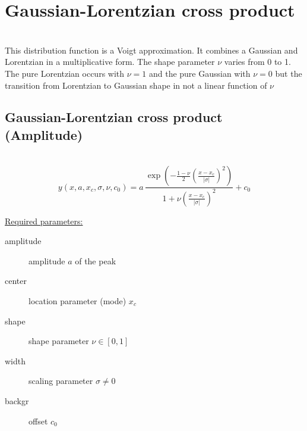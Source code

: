 \clearpage
\section{Gaussian-Lorentzian cross product} ~\\
\label{sec:GaussianLorentzianCrossProduct}
This distribution function is a Voigt approximation. It combines a Gaussian and Lorentzian
in a multiplicative form. The shape parameter $\nu$ varies from 0 to 1. The pure
Lorentzian occurs with $\nu=1$ and the pure Gaussian with $\nu=0$ but the transition from
Lorentzian to Gaussian shape in not a linear function of $\nu$

\vspace{5mm} \clearpage

\subsection{Gaussian-Lorentzian cross product (Amplitude)} ~\\
\label{sec:GaussianLorentzianCrossProductAmplitude}
\begin{equation}
y(x,a,x_c,\sigma,\nu,c_0) = a\,
\frac{\exp\left(-\frac{1-\nu}{2}\left(\frac{x-x_c}{|\sigma|}\right)^2\right)}{1+\nu\left(\frac{x-x_c}{|\sigma|}\right)^2}+c_0
\end{equation}
\vspace{5mm}

\underline{Required parameters:}
\begin{description}
    \item[amplitude] amplitude $a$ of the peak
    \item[center] location parameter (mode) $x_c$
    \item[shape] shape parameter $\nu\in [0,1]$
    \item[width] scaling parameter $\sigma \neq 0$
    \item[backgr] offset $c_0$
\end{description}

